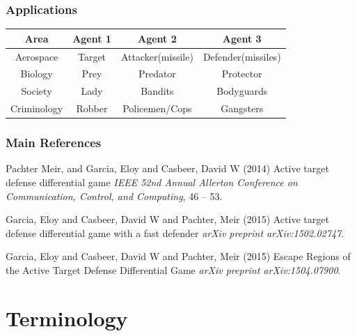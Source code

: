 \documentclass{beamer}
\begin{document}
\begin{frame}
\frametitle{Applications}
\begin{center}
\begin{tabular}{ |c||c|c|c| } 
\hline
Area & Agent 1 & Agent 2 & Agent 3 \\
 \hline
 \hline
 Aerospace & Target & Attacker(missile) & Defender(missiles)\\
 \hline 
 Biology & Prey & Predator & Protector \\
 \hline 
 Society & Lady & Bandits & Bodyguards\\ 
 \hline
 Criminology & Robber & Policemen/Cops & Gangsters \\ 
  \hline
\end{tabular}
\label{tableTAD}
\end{center}  
\end{frame}


\begin{frame}
\frametitle{Main References}
\footnotesize{
\begin{thebibliography}{99} %
 Pachter Meir, and Garcia, Eloy and Casbeer, David W (2014)
\newblock Active target defense differential game
\newblock \emph{IEEE 52nd Annual Allerton Conference on Communication, Control, and Computing}, 46 -- 53.

Garcia, Eloy and Casbeer, David W and Pachter, Meir (2015)
\newblock Active target defense differential game with a fast defender
\newblock \emph{arXiv preprint arXiv:1502.02747}.

Garcia, Eloy and Casbeer, David W and Pachter, Meir (2015)
\newblock Escape Regions of the Active Target Defense Differential Game
\newblock \emph{arXiv preprint arXiv:1504.07900}.

\end{thebibliography}
}
\end{frame}


\section{Terminology}
\end{document}
